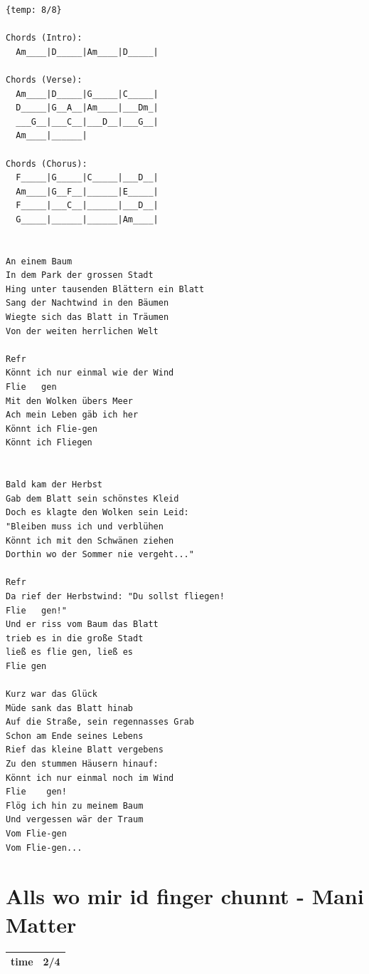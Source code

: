 \documentclass[
]{book}
\let\stdsection\section
\renewcommand\section{\clearpage\stdsection}
\begin{document}
\begin{verbatim}
{temp: 8/8}

Chords (Intro):
  Am____|D_____|Am____|D_____|

Chords (Verse):
  Am____|D_____|G_____|C_____|
  D_____|G__A__|Am____|___Dm_|
  ___G__|___C__|___D__|___G__|
  Am____|______|

Chords (Chorus):
  F_____|G_____|C_____|___D__|
  Am____|G__F__|______|E_____|
  F_____|___C__|______|___D__|
  G_____|______|______|Am____|


An einem Baum
In dem Park der grossen Stadt
Hing unter tausenden Blättern ein Blatt
Sang der Nachtwind in den Bäumen
Wiegte sich das Blatt in Träumen
Von der weiten herrlichen Welt

Refr
Könnt ich nur einmal wie der Wind
Flie   gen
Mit den Wolken übers Meer
Ach mein Leben gäb ich her
Könnt ich Flie-gen
Könnt ich Fliegen


Bald kam der Herbst
Gab dem Blatt sein schönstes Kleid
Doch es klagte den Wolken sein Leid:
"Bleiben muss ich und verblühen
Könnt ich mit den Schwänen ziehen
Dorthin wo der Sommer nie vergeht..."

Refr
Da rief der Herbstwind: "Du sollst fliegen! 
Flie   gen!"
Und er riss vom Baum das Blatt
trieb es in die große Stadt
ließ es flie gen, ließ es
Flie gen
 
Kurz war das Glück
Müde sank das Blatt hinab
Auf die Straße, sein regennasses Grab
Schon am Ende seines Lebens
Rief das kleine Blatt vergebens
Zu den stummen Häusern hinauf:
Könnt ich nur einmal noch im Wind
Flie    gen!
Flög ich hin zu meinem Baum
Und vergessen wär der Traum
Vom Flie-gen
Vom Flie-gen...
\end{verbatim}

\hypertarget{mundart-und-deutsch-alls-wo-mir-id-finger-chunnt}{%
\section{Alls wo mir id finger chunnt - Mani Matter}\label{mundart-und-deutsch-alls-wo-mir-id-finger-chunnt}}

\begin{longtable}[]{@{}ll@{}}
\toprule
\endhead
time & 2/4\tabularnewline
\bottomrule
\end{longtable}
\end{document}
